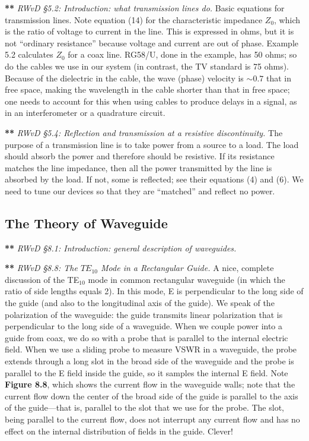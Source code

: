 \documentclass[12pt,preprint]{aastex}
\begin{document}
{\bf ***} {\it RWvD \S 5.2:  Introduction: what transmission lines do.}
Basic equations for transmission lines.  Note
equation (14) for the characteristic impedance $Z_0$, which is the ratio
of voltage to current in the line.  This is expressed in ohms, but it is
not ``ordinary resistance'' because voltage and current are out of
phase.  Example 5.2 calculates $Z_0$ for a coax line.  RG58/U, done in
the example, has 50 ohms; so do the cables we use in our system (in
contrast, the TV standard is 75 ohms).  Because of the dielectric in the
cable, the wave (phase) velocity is $\sim 0.7$ that in free space,
making the wavelength in the cable shorter than that in free space; one
needs to account for this when using cables to produce delays in a
signal, as in an interferometer or a quadrature circuit. 

{\bf ***} {\it RWvD \S 5.4: Reflection and transmission at a resistive
discontinuity.} The purpose of a transmission line is to take power from
a source to a load. The load should absorb the power and therefore
should be resistive. If its resistance matches the line impedance, then
all the power transmitted by the line is absorbed by the load. If not,
some is reflected; see their equations (4) and (6). We need to tune our
devices so that they are ``matched'' and reflect no power. 

\subsection{The Theory of Waveguide}
          
{\bf ***} {\it RWvD \S 8.1:  Introduction: general description of
waveguides.} 

{\bf ***} {\it RWvD \S 8.8:  The $TE_{10}$ Mode in a Rectangular
Guide.} A nice, complete discussion of the TE$_{10}$ mode in common
rectangular waveguide (in which the ratio of side lengths equals 2). 
In this mode, E is perpendicular to the long side of the guide
(and also to the longitudinal axis of the guide).  We speak of the
polarization of the waveguide: the guide transmits linear polarization
that is perpendicular to the long side of a waveguide.  When we couple
power into a guide from coax, we do so with a probe that is parallel to
the internal electric field.  When we use a sliding probe to measure
VSWR in a waveguide, the probe extends through a long slot in the broad
side of the waveguide and the probe is parallel to the E field inside
the guide, so it samples the internal E field.  Note {\bf Figure 8.8},
which shows the current flow in the waveguide walls; note that the
current flow down the center of the broad side of the guide is parallel
to the axis of the guide---that is, parallel to the slot that we use for
the probe.  The slot, being parallel to the current flow, does not
interrupt any current flow and has no effect on the internal
distribution of fields in the guide.  Clever!
\end{document}
